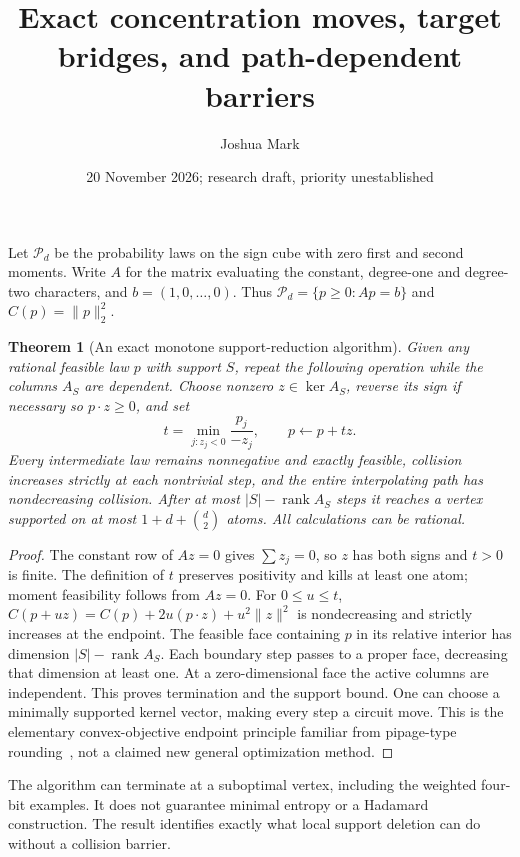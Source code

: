 \documentclass[11pt]{article}
\title{Exact concentration moves, target bridges, and path-dependent barriers}
\author{Joshua Mark}
\date{20 November 2026; research draft, priority unestablished}
\newtheorem{theorem}{Theorem}
\begin{document}
\maketitle
Let $\mathcal P_d$ be the probability laws on the sign cube with
zero first and second moments. Write $A$ for the matrix evaluating
the constant, degree-one and degree-two characters, and $b=(1,0,\ldots,0)$.
Thus $\mathcal P_d=\{p\ge0:Ap=b\}$ and $C(p)=\|p\|_2^2$.

\begin{theorem}[An exact monotone support-reduction algorithm]
Given any rational feasible law $p$ with support $S$, repeat the
following operation while the columns $A_S$ are dependent.
Choose nonzero $z\in\ker A_S$, reverse its sign if necessary so
$p\cdot z\ge0$, and set
\[
 t=\min_{j:z_j<0}\frac{p_j}{-z_j},\qquad p\leftarrow p+tz.
\]
Every intermediate law remains nonnegative and exactly feasible,
collision increases strictly at each nontrivial step, and the entire
interpolating path has nondecreasing collision. After at most
$|S|-\operatorname{rank}A_S$ steps it reaches a vertex supported on
at most $1+d+\binom d2$ atoms. All calculations can be rational.
\end{theorem}
\begin{proof}
The constant row of $Az=0$ gives $\sum z_j=0$, so $z$ has both
signs and $t>0$ is finite. The definition of $t$ preserves positivity
and kills at least one atom; moment feasibility follows from $Az=0$.
For $0\le u\le t$,
$C(p+uz)=C(p)+2u(p\cdot z)+u^2\|z\|^2$ is nondecreasing and
strictly increases at the endpoint. The feasible face containing
$p$ in its relative interior has dimension
$|S|-\operatorname{rank}A_S$. Each boundary step passes to a proper
face, decreasing that dimension at least one. At a zero-dimensional
face the active columns are independent. This proves termination
and the support bound. One can choose a minimally supported kernel
vector, making every step a circuit move. This is the elementary
convex-objective endpoint principle familiar from pipage-type
rounding~\cite{AS}, not a claimed new general optimization method.
\end{proof}
The algorithm can terminate at a suboptimal vertex, including the
weighted four-bit examples. It does not guarantee minimal entropy
or a Hadamard construction. The result identifies exactly what local
support deletion can do without a collision barrier.
\end{document}
